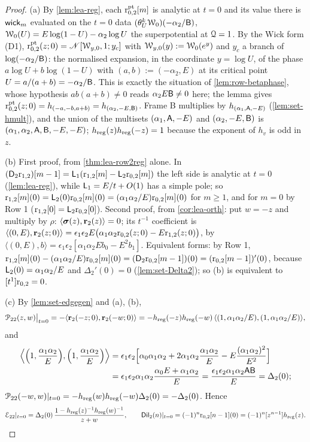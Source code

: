 \begin{proof}
(a) By \cref{lem:lea-reg}, each $\mathrm{r}^{\mathrm{pt}}_{0,2}[m]$ is analytic at $t = 0$ and its value there is $\mathsf{wick}_m$ evaluated on the $t = 0$ data $(\theta_{U}^k\mathcal{W}_0)(-\alpha_2/\mathsf{B})$, $\mathcal{W}_0(U) = E\log(1-U) - \alpha_2\log U$ the superpotential at $\mathcal{Q} = 1$. By the Wick form (D1), $\mathrm{r}^{\mathrm{pt}}_{0,2}(z;0) = \mathscr{N}[\mathcal{W}_{y,0},1;y_c]$ with $\mathcal{W}_{y,0}(y) := \mathcal{W}_0(e^y)$ and $y_c$ a branch of $\log(-\alpha_2/\mathsf{B})$: the normalised expansion, in the coordinate $y = \log U$, of the phase $a\log U + b\log(1-U)$ with $(a,b) := (-\alpha_2,E)$ at its critical point $U = a/(a+b) = -\alpha_2/\mathsf{B}$. This is exactly the situation of \cref{lem:row-betaphase}, whose hypothesis $ab(a+b)\neq 0$ reads $\alpha_2E\mathsf{B}\neq 0$ here; the lemma gives $\mathrm{r}^{\mathrm{pt}}_{0,2}(z;0) = h_{(-a,-b,a+b)} = h_{(\alpha_2,-E,\mathsf{B})}$. Frame B multiplies by $h_{(\alpha_1,\mathsf{A},-E)}$ (\cref{lem:set-hmult}), and the union of the multisets $(\alpha_1,\mathsf{A},-E)$ and $(\alpha_2,-E,\mathsf{B})$ is $(\alpha_1,\alpha_2,\mathsf{A},\mathsf{B},-E,-E)$; $h_{\mathrm{reg}}(z)h_{\mathrm{reg}}(-z) = 1$ because the exponent of $h_v$ is odd in $z$.

(b) First proof, from \cref{thm:lea-row2reg} alone. In $(\mathsf{D}_2\mathrm{r}_{1,2})[m-1] = \mathsf{L}_1(\mathrm{r}_{1,2}[m] - \mathsf{L}_2\mathrm{r}_{0,2}[m])$ the left side is analytic at $t = 0$ (\cref{lem:lea-reg}), while $\mathsf{L}_1 = E/t + O(1)$ has a simple pole; so $\mathrm{r}_{1,2}[m](0) = \mathsf{L}_2(0)\mathrm{r}_{0,2}[m](0) = (\alpha_1\alpha_2/E)\mathrm{r}_{0,2}[m](0)$ for $m\geq 1$, and for $m = 0$ by Row 1 ($\mathrm{r}_{1,2}[0] = \mathsf{L}_2\mathrm{r}_{0,2}[0]$). Second proof, from \cref{cor:lea-orth}: put $w = -z$ and multiply by $\rho$: $\langle\boldsymbol{\sigma}(z),\mathbf{r}_2(z)\rangle = 0$; its $t^{-1}$ coefficient is $\langle(0,E),\mathbf{r}_2(z;0)\rangle = \epsilon_1\epsilon_2E\bigl(\alpha_1\alpha_2\mathrm{r}_{0,2}(z;0) - E\mathrm{r}_{1,2}(z;0)\bigr)$, by $\langle(0,E),b\rangle = \epsilon_1\epsilon_2[\alpha_1\alpha_2Eb_0 - E^2b_1]$. Equivalent forms: by Row 1, $\mathrm{r}_{1,2}[m](0) - (\alpha_1\alpha_2/E)\mathrm{r}_{0,2}[m](0) = (\mathsf{D}_2\mathrm{r}_{0,2}[m-1])(0) = (\mathrm{r}_{0,2}[m-1])'(0)$, because $\mathsf{L}_2(0) = \alpha_1\alpha_2/E$ and $\Delta_2'(0) = 0$ (\cref{lem:set-Delta2}); so (b) is equivalent to $[t^1]\mathrm{r}_{0,2} = 0$.

(c) By \cref{lem:set-edgegen} and (a), (b),
\[
\mathcal{P}_{22}(z,w)\big|_{t=0} = -\langle\mathbf{r}_2(-z;0),\mathbf{r}_2(-w;0)\rangle = -h_{\mathrm{reg}}(-z)h_{\mathrm{reg}}(-w)\,\langle(1,\alpha_1\alpha_2/E),(1,\alpha_1\alpha_2/E)\rangle,
\]
and
\begin{align*}
\Bigl\langle\Bigl(1,\frac{\alpha_1\alpha_2}{E}\Bigr),\Bigl(1,\frac{\alpha_1\alpha_2}{E}\Bigr)\Bigr\rangle &= \epsilon_1\epsilon_2\Bigl[\alpha_0\alpha_1\alpha_2 + 2\alpha_1\alpha_2\frac{\alpha_1\alpha_2}{E} - E\frac{(\alpha_1\alpha_2)^2}{E^2}\Bigr]\\
&= \epsilon_1\epsilon_2\alpha_1\alpha_2\frac{\alpha_0E+\alpha_1\alpha_2}{E} = \frac{\epsilon_1\epsilon_2\alpha_1\alpha_2\mathsf{A}\mathsf{B}}{E} = \Delta_2(0);
\end{align*}
$\mathcal{P}_{22}(-w,w)|_{t=0} = -h_{\mathrm{reg}}(w)h_{\mathrm{reg}}(-w)\Delta_2(0) = -\Delta_2(0)$. Hence
\[
\mathcal{E}_{22}|_{t=0} = \Delta_2(0)\,\frac{1 - h_{\mathrm{reg}}(z)^{-1}h_{\mathrm{reg}}(w)^{-1}}{z+w},\qquad \mathsf{Dil}_2(n)|_{t=0} = (-1)^n\mathrm{r}_{0,2}[n-1](0) = (-1)^n[z^{n-1}]h_{\mathrm{reg}}(z).
\]
\end{proof}

